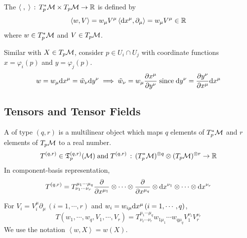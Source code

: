 \documentclass[a4paper, 10pt]{article}
\begin{document}
\begin{definition}
    The  $\left<\;,\;\right>\,:\, T_{p}^{\ast}\mathcal{M} \times T_{p}\mathcal{M} \rightarrow \mathbb{R}$ is defined by
    \[ \left<w, V\right> = w_{\mu}V^{\mu}\left<\mathrm{d}{x}^{\mu},\partial_{\mu}\right> = w_{\mu}V^{\mu} \in \mathbb{R} \]
    where $w \in T_{p}^{\ast}\mathcal{M}$ and $V \in T_{p}\mathcal{M}$.
\end{definition}

\begin{remark}
    Similar with $X \in T_{p}\mathcal{M}$, consider $p \in U_{i} \cap U_{j}$ with coordinate functions $x = \varphi_{i}(p)$ and $y = \varphi_{j}(p)$.
    \[ w = w_{\mu}\mathrm{d}{x}^{\mu} = \tilde{w}_{\nu}\mathrm{d}{y}^{\nu} \;\Longrightarrow\; \tilde{w}_{\nu} = w_{\mu}\frac{\partial x^{\mu}}{\partial y^{\nu}} \;\text{since}\; \mathrm{d}{y}^{\nu} = \frac{\partial y^{\nu}}{\partial x^{\mu}} \mathrm{d}{x}^{\mu} \]
\end{remark}

\subsection{Tensors and Tensor Fields}

\begin{definition}
    A  of type $(q,r)$ is a multilinear object which maps $q$ elements of $T_{p}^{\ast}\mathcal{M}$ and $r$ elements of $T_{p}\mathcal{M}$ to a real number.
    \[ T^{(q,r)} \in \mathfrak{T}_{p}^{(q,r)}(\mathcal{M}) \;\text{and}\; T^{(q,r)} \,:\, (T_{p}^{\ast}\mathcal{M})^{\otimes q} \otimes (T_{p}\mathcal{M})^{\otimes r} \rightarrow \mathbb{R} \]
    In component-basis representation,
    \[ T^{(q,r)} = T^{\mu_{1}\cdots \mu_{q}}_{\nu_{1}\cdots\nu_{r}}\frac{\partial}{\partial x^{\mu_{1}}} \otimes \cdots \otimes \frac{\partial}{\partial x^{\mu_{q}}} \otimes \mathrm{d}{x}^{\nu_{1}} \otimes \cdots \otimes \mathrm{d}{x}^{\nu_{r}} \]
\end{definition}
\newpage


\begin{remark}
    For $V_{i} = V_{i}^{\mu}\partial_{\mu}\,(i = 1,\cdots, r)$ and $w_{i} = w_{i\mu}\mathrm{d}{x}^{\mu}\,(i = 1,\cdots,q)$,
    \[ T(w_{1},\cdots,w_{q},V_{1},\cdots,V_{r}) = T^{\mu_{1}\cdots \mu_{q}}_{\nu_{1}\cdots\nu_{r}}w_{1\mu_{1}}\cdots w_{q\mu_{q}}V_{1}^{\nu_{1}}V_{r}^{\nu_{r}} \]
    We use the notation $\left<w, X\right> = w(X)$.
\end{remark}
\end{document}
